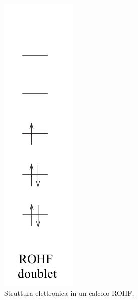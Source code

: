 \documentclass[oneside]{amsbook}
\numberwithin{section}{chapter}
\numberwithin{equation}{section}
\numberwithin{figure}{section}
\begin{document}
\begin{figure}[H]
\centering
\caption{Struttura elettronica in un calcolo ROHF.}\label{Rof}
\includegraphics[scale=0.25]{rof}
\end{figure}
\end{document}
